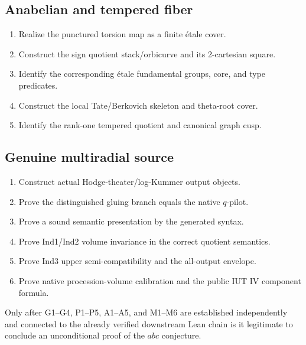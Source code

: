 \documentclass[11pt]{article}
\begin{document}
\subsection*{Anabelian and tempered fiber}
\begin{enumerate}[label=A\arabic*.]
\item Realize the punctured torsion map as a finite \'etale cover.
\item Construct the sign quotient stack/orbicurve and its 2-cartesian square.
\item Identify the corresponding \'etale fundamental groups, core, and type
predicates.
\item Construct the local Tate/Berkovich skeleton and theta-root cover.
\item Identify the rank-one tempered quotient and canonical graph cusp.
\end{enumerate}

\subsection*{Genuine multiradial source}
\begin{enumerate}[label=M\arabic*.]
\item Construct actual Hodge-theater/log-Kummer output objects.
\item Prove the distinguished gluing branch equals the native $q$-pilot.
\item Prove a sound semantic presentation by the generated syntax.
\item Prove Ind1/Ind2 volume invariance in the correct quotient semantics.
\item Prove Ind3 upper semi-compatibility and the all-output envelope.
\item Prove native procession-volume calibration and the public IUT IV
component formula.
\end{enumerate}

Only after G1--G4, P1--P5, A1--A5, and M1--M6 are established independently
and connected to the already verified downstream Lean chain is it legitimate
to conclude an unconditional proof of the $abc$ conjecture.
\end{document}
